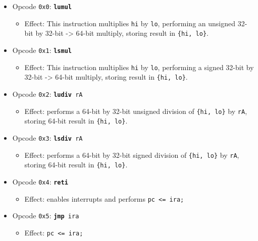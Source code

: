 \documentclass{article}
\begin{document}
	\singlespacing
	\begin{itemize}
		\item Opcode \texttt{0x0}:
			\texttt{\textbf{lumul}}
		\begin{itemize}
			\item Effect:  This instruction multiplies \texttt{hi} by
			\texttt{lo}, performing an unsigned 32-bit by 32-bit -> 64-bit
			multiply, storing result in \texttt{\{hi, lo\}}.
		\end{itemize}
		\item Opcode \texttt{0x1}:
			\texttt{\textbf{lsmul}}
		\begin{itemize}
			\item Effect:  This instruction multiplies \texttt{hi} by
			\texttt{lo}, performing a signed 32-bit by 32-bit -> 64-bit
			multiply, storing result in \texttt{\{hi, lo\}}.
		\end{itemize}
		\item Opcode \texttt{0x2}:
			\texttt{\textbf{ludiv} rA}
		\begin{itemize}
			\item Effect:  performs a 64-bit by 32-bit unsigned division of
			\texttt{\{hi, lo\}} by \texttt{rA}, storing 64-bit result in
			\texttt{\{hi, lo\}}.
		\end{itemize}
		\item Opcode \texttt{0x3}:
			\texttt{\textbf{lsdiv} rA}
		\begin{itemize}
			\item Effect:  performs a 64-bit by 32-bit signed division of
			\texttt{\{hi, lo\}} by \texttt{rA}, storing 64-bit result in
			\texttt{\{hi, lo\}}.
		\end{itemize}
		\item Opcode \texttt{0x4}:
			\texttt{\textbf{reti}}
		\begin{itemize}
			\item Effect:  enables interrupts and performs
			\texttt{pc <= ira;}
		\end{itemize}
		\item Opcode \texttt{0x5}:
			\texttt{\textbf{jmp} ira}
		\begin{itemize}
			\item Effect:  \texttt{pc <= ira;}
		\end{itemize}
	\end{itemize}
	\doublespacing

\end{document}
